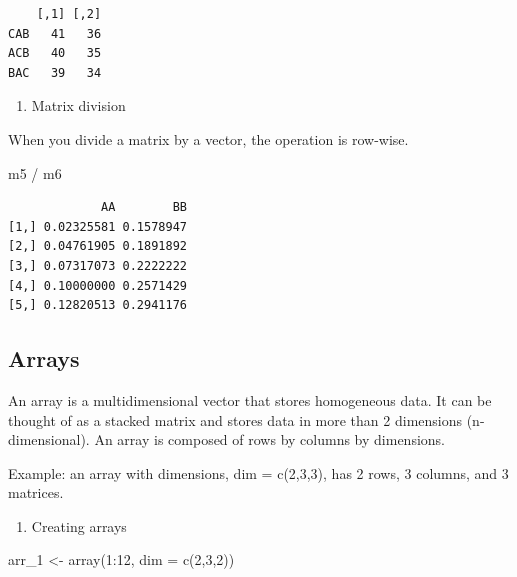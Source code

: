 \documentclass[
  letterpaper,
  DIV=11,
  numbers=noendperiod]{scrreprt}
\newenvironment{Shaded}{\begin{snugshade}}{\end{snugshade}}
\newcommand{\AttributeTok}[1]{\textcolor[rgb]{0.40,0.45,0.13}{#1}}
\newcommand{\DecValTok}[1]{\textcolor[rgb]{0.68,0.00,0.00}{#1}}
\newcommand{\FunctionTok}[1]{\textcolor[rgb]{0.28,0.35,0.67}{#1}}
\newcommand{\NormalTok}[1]{\textcolor[rgb]{0.00,0.23,0.31}{#1}}
\newcommand{\OtherTok}[1]{\textcolor[rgb]{0.00,0.23,0.31}{#1}}
\newcommand{\SpecialCharTok}[1]{\textcolor[rgb]{0.37,0.37,0.37}{#1}}
\providecommand{\tightlist}{%
  \setlength{\itemsep}{0pt}\setlength{\parskip}{0pt}}\usepackage{longtable,booktabs,array}
\begin{document}
\begin{verbatim}
    [,1] [,2]
CAB   41   36
ACB   40   35
BAC   39   34
\end{verbatim}

\begin{enumerate}
\def\labelenumi{\roman{enumi}.}
\tightlist
\item
  Matrix division
\end{enumerate}

When you divide a matrix by a vector, the operation is row-wise.

\begin{Shaded}
\begin{Highlighting}[]
\NormalTok{m5 }\SpecialCharTok{/}\NormalTok{ m6}
\end{Highlighting}
\end{Shaded}

\begin{verbatim}
             AA        BB
[1,] 0.02325581 0.1578947
[2,] 0.04761905 0.1891892
[3,] 0.07317073 0.2222222
[4,] 0.10000000 0.2571429
[5,] 0.12820513 0.2941176
\end{verbatim}

\subsection{Arrays}\label{arrays}

An array is a multidimensional vector that stores homogeneous data. It
can be thought of as a stacked matrix and stores data in more than 2
dimensions (n-dimensional). An array is composed of rows by columns by
dimensions.

Example: an array with dimensions, dim = c(2,3,3), has 2 rows, 3
columns, and 3 matrices.

\begin{enumerate}
\def\labelenumi{\alph{enumi}.}
\setcounter{enumi}{1}
\tightlist
\item
  Creating arrays
\end{enumerate}

\begin{Shaded}
\begin{Highlighting}[]
\NormalTok{arr\_1 }\OtherTok{\textless{}{-}} \FunctionTok{array}\NormalTok{(}\DecValTok{1}\SpecialCharTok{:}\DecValTok{12}\NormalTok{, }\AttributeTok{dim =} \FunctionTok{c}\NormalTok{(}\DecValTok{2}\NormalTok{,}\DecValTok{3}\NormalTok{,}\DecValTok{2}\NormalTok{))}
\end{Highlighting}
\end{Shaded}
\end{document}
